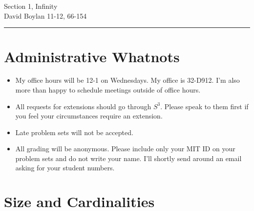 \documentclass[justified]{tufte-handout}
\newcommand{\HRule}{\rule{\linewidth}{0.1mm}}
\begin{document}
\frenchspacing

\begin{fullwidth}
\noindent\Large Section 1, Infinity \large \\[.3cm]
\noindent  David Boylan \hfill{11-12, 66-154}

\noindent\HRule
\end{fullwidth}

\section{Administrative Whatnots}

\begin{itemize}


\item My office hours will be 12-1 on Wednesdays. My office is 32-D912. I'm also more than happy to schedule meetings outside of office hours.

\item All requests for extensions should go through $S^3$. Please speak to them first if you feel your circumstances require an extension.


\item Late problem sets will not be accepted. 


\item All grading will be anonymous. Please include only your MIT ID on your problem sets and do not write your name. I'll shortly send around an email asking for your student numbers.



\end{itemize}



\section{Size and Cardinalities}
\end{document}
